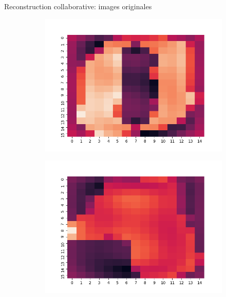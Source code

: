 \documentclass[hyperref={pdfpagelabels=false}]{beamer}
\begin{document}
    \begin{frame}{Reconstruction collaborative: images originales}
        \begin{figure}[h]
            \centering
            \begin{subfigure}[c]{0.18\textwidth}
                \includegraphics[scale=.12]{o0}
            \end{subfigure}
            \begin{subfigure}[c]{0.18\textwidth}
                \includegraphics[scale=.12]{o1}
            \end{subfigure}
            \begin{subfigure}[c]{0.18\textwidth}

\end{subfigure}
\end{figure}
\end{frame}
\end{document}
